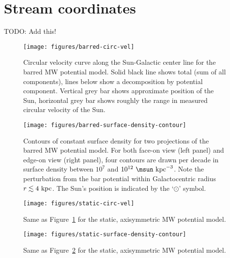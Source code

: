 \documentclass[letterpaper,12pt,preprint]{aastex}
\newcommand{\todo}[1]{{\color{red} TODO: #1}}
\begin{document}



\appendix
\section{Stream coordinates} \label{sec:rotationmatrix}
\todo{Add this!}

\clearpage
\begin{figure}[p]
\begin{center}
\texttt{[image: figures/barred-circ-vel]}
\caption{Circular velocity curve along the Sun-Galactic center line for the barred MW potential model. Solid black line shows total (sum of all components), lines below show a decomposition by potential component. Vertical grey bar shows approximate position of the Sun, horizontal grey bar shows roughly the range in measured circular velocity of the Sun.}
\label{fig:circ-vel-barred}
\end{center}
\end{figure}

\clearpage
\begin{figure}[p]
\begin{center}
\texttt{[image: figures/barred-surface-density-contour]}
\caption{Contours of constant surface density for two projections of the barred MW potential model. For both face-on view (left panel) and edge-on view (right panel), four contours are drawn per decade in surface density between $10^7$ and $10^{12}~\msun~{\rm kpc}^{-3}$. Note the perturbation from the bar potential within Galactocentric radius $r \lesssim 4~{\rm kpc}$. The Sun's position is indicated by the `$\odot$' symbol.}
\label{fig:surface-density-barred}
\end{center}
\end{figure}

\clearpage
\begin{figure}[p]
\begin{center}
\texttt{[image: figures/static-circ-vel]}
\caption{Same as Figure~\ref{fig:circ-vel-barred} for the static, axisymmetric MW potential model. }
\label{fig:circ-vel-static}
\end{center}
\end{figure}

\clearpage
\begin{figure}[p]
\begin{center}
\texttt{[image: figures/static-surface-density-contour]}
\caption{Same as Figure~\ref{fig:surface-density-barred} for the static, axisymmetric MW potential model. }
\label{fig:surface-density-static}
\end{center}
\end{figure}
\end{document}

